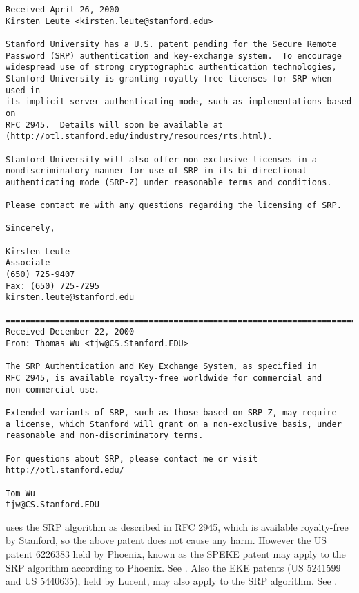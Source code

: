 \begin{verbatim}
Received April 26, 2000
Kirsten Leute <kirsten.leute@stanford.edu>

Stanford University has a U.S. patent pending for the Secure Remote
Password (SRP) authentication and key-exchange system.  To encourage
widespread use of strong cryptographic authentication technologies,
Stanford University is granting royalty-free licenses for SRP when used in
its implicit server authenticating mode, such as implementations based on
RFC 2945.  Details will soon be available at
(http://otl.stanford.edu/industry/resources/rts.html).

Stanford University will also offer non-exclusive licenses in a
nondiscriminatory manner for use of SRP in its bi-directional
authenticating mode (SRP-Z) under reasonable terms and conditions.

Please contact me with any questions regarding the licensing of SRP.

Sincerely,

Kirsten Leute
Associate
(650) 725-9407
Fax: (650) 725-7295
kirsten.leute@stanford.edu

======================================================================================
Received December 22, 2000
From: Thomas Wu <tjw@CS.Stanford.EDU>

The SRP Authentication and Key Exchange System, as specified in
RFC 2945, is available royalty-free worldwide for commercial and
non-commercial use.

Extended variants of SRP, such as those based on SRP-Z, may require
a license, which Stanford will grant on a non-exclusive basis, under
reasonable and non-discriminatory terms.

For questions about SRP, please contact me or visit
http://otl.stanford.edu/

Tom Wu
tjw@CS.Stanford.EDU

\end{verbatim}

\par
\gnutls{} uses the SRP algorithm as described in RFC 2945, which
is available royalty-free by Stanford, so the above patent does
not cause any harm. However 
the US patent 6226383 held by Phoenix, known as the SPEKE patent
may apply to the SRP algorithm according to Phoenix.
See . 
Also the EKE patents (US 5241599 and US 5440635), held by Lucent,
may also apply to the SRP algorithm. See
.
